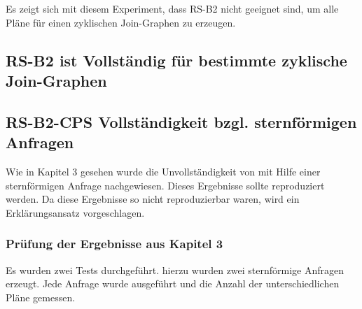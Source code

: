 Es zeigt sich mit diesem Experiment, dass RS-B2 nicht geeignet sind, um alle Pläne für einen zyklischen Join-Graphen zu erzeugen.

\subsection{RS-B2 ist Vollständig für bestimmte zyklische Join-Graphen}







\subsection{RS-B2-CPS Vollständigkeit bzgl. sternförmigen Anfragen}

Wie in Kapitel 3 gesehen wurde die Unvollständigkeit von \cite{bachelor}  mit Hilfe einer sternförmigen Anfrage nachgewiesen. Dieses Ergebnisse sollte reproduziert werden. Da diese Ergebnisse so nicht reproduzierbar waren, wird ein Erklärungsansatz vorgeschlagen.

\subsubsection{Prüfung der Ergebnisse aus Kapitel 3}
Es wurden zwei Tests durchgeführt. hierzu wurden zwei sternförmige Anfragen erzeugt. Jede Anfrage wurde ausgeführt und die Anzahl der unterschiedlichen Pläne gemessen.

